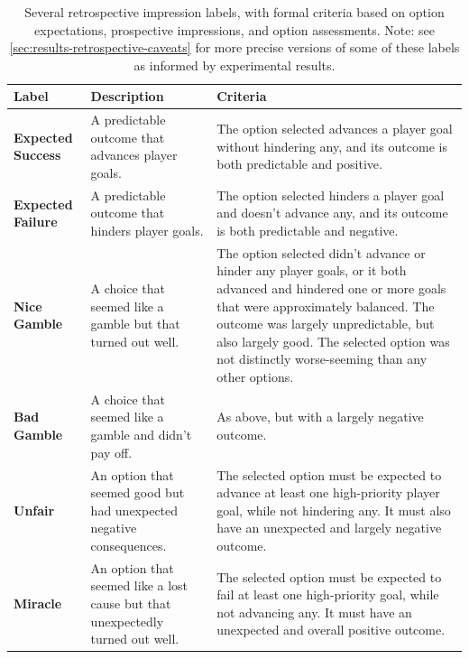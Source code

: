 \begin{table}[!p]
\begingroup
\renewcommand*{\arraystretch}{1.5}
\begin{tabular}{p{4.5em}p{14em}p{14.5em}}
\textbf{Label} & \textbf{Description} & \textbf{Criteria} \\
\hline
\textbf{Expected Success} & A predictable outcome that advances player goals. & The option selected advances a player goal without hindering any, and its outcome is both predictable and positive. \\
\textbf{Expected Failure} & A predictable outcome that hinders player goals. & The option selected hinders a player goal and doesn't advance any, and its outcome is both predictable and negative. \\
\textbf{Nice Gamble} & A choice that seemed like a gamble but that turned out well. & The option selected didn't advance or hinder any player goals, or it both advanced and hindered one or more goals that were approximately balanced. The outcome was largely unpredictable, but also largely good. The selected option was not distinctly worse-seeming than any other options. \\
\textbf{Bad Gamble} & A choice that seemed like a gamble and didn't pay off. & As above, but with a largely negative outcome. \\
\textbf{Unfair} & An option that seemed good but had unexpected negative consequences. & The selected option must be expected to advance at least one high-priority player goal, while not hindering any. It must also have an unexpected and largely negative outcome. \\
\textbf{Miracle} & An option that seemed like a lost cause but that unexpectedly turned out well. & The selected option must be expected to fail at least one high-priority goal, while not advancing any. It must have an unexpected and overall positive outcome. \\
\end{tabular}
\endgroup
\caption[Retrospective outcome impressions]{Several retrospective impression labels, with formal criteria based on option expectations, prospective impressions, and option assessments. Note: see \cref{sec:results-retrospective-caveats} for more precise versions of some of these labels as informed by experimental results.}
\label{tab:retrospective-impressions}
\end{table}


